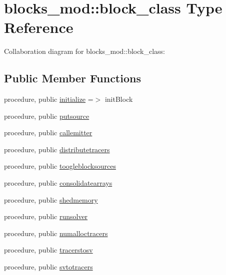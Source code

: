 \hypertarget{structblocks__mod_1_1block__class}{}\section{blocks\+\_\+mod\+:\+:block\+\_\+class Type Reference}
\label{structblocks__mod_1_1block__class}


Collaboration diagram for blocks\+\_\+mod\+:\+:block\+\_\+class\+:
\subsection*{Public Member Functions}
\begin{DoxyCompactItemize}
\item 
procedure, public \mbox{\hyperlink{structblocks__mod_1_1block__class_ad671745ca5dc3227ddb0ed1d9ff45268}{initialize}} =$>$ init\+Block
\item 
procedure, public \mbox{\hyperlink{structblocks__mod_1_1block__class_ac79980e841902691a06212dce50f6331}{putsource}}
\item 
procedure, public \mbox{\hyperlink{structblocks__mod_1_1block__class_ad1d0f1aca1323fad86177deb0b818a51}{callemitter}}
\item 
procedure, public \mbox{\hyperlink{structblocks__mod_1_1block__class_a00f8c114e84499356db3f8b633a6b3a3}{distributetracers}}
\item 
procedure, public \mbox{\hyperlink{structblocks__mod_1_1block__class_a73bd9f99f97d7fd882a3ade1103d27ae}{toogleblocksources}}
\item 
procedure, public \mbox{\hyperlink{structblocks__mod_1_1block__class_a68f5bb0cb32b5b51cffd66d472cc45f0}{consolidatearrays}}
\item 
procedure, public \mbox{\hyperlink{structblocks__mod_1_1block__class_a2e0c6452c90707a798ba55efaba43121}{shedmemory}}
\item 
procedure, public \mbox{\hyperlink{structblocks__mod_1_1block__class_abe738c65f3fecf013c3884275a3fe7e4}{runsolver}}
\item 
procedure, public \mbox{\hyperlink{structblocks__mod_1_1block__class_a7a3f2eb6823a683a6aaa2159b50ee990}{numalloctracers}}
\item 
procedure, public \mbox{\hyperlink{structblocks__mod_1_1block__class_a5a0ac8b8f2440af5e52a7c4bc59be470}{tracerstosv}}
\item 
procedure, public \mbox{\hyperlink{structblocks__mod_1_1block__class_a5f32bf4e17b571024c594cb4866513ee}{svtotracers}}

\end{DoxyCompactItemize}
